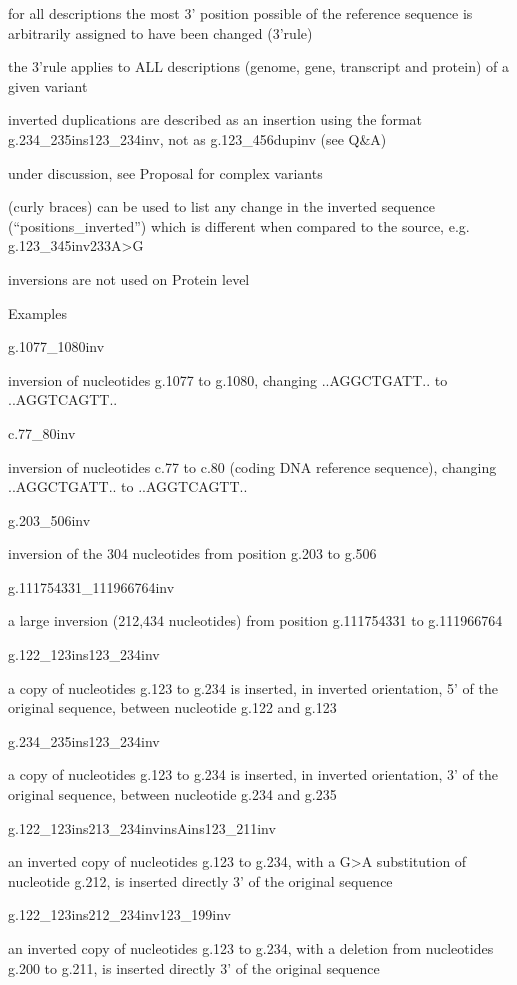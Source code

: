 \documentclass{book}
\begin{document}
	for all descriptions the most 3’ position possible of the reference sequence is arbitrarily assigned to have been changed (3’rule) 

	the 3’rule applies to ALL descriptions (genome, gene, transcript and protein) of a given variant

	inverted duplications are described as an insertion using the format g.234\_235ins123\_234inv, not as g.123\_456dupinv (see Q\&A)

	under discussion, see Proposal for complex variants

	{ } (curly braces) can be used to list any change in the inverted sequence (“positions\_inverted”) which is different when compared to the source, e.g. g.123\_345inv{233A>G}

	inversions are not used on Protein level

	

	

	Examples

	g.1077\_1080inv

	inversion of nucleotides g.1077 to g.1080, changing ..AGGCTGATT.. to ..AGGTCAGTT..

	c.77\_80inv

	inversion of nucleotides c.77 to c.80 (coding DNA reference sequence), changing ..AGGCTGATT.. to ..AGGTCAGTT..

	g.203\_506inv

	inversion of the 304 nucleotides from position g.203 to g.506

	g.111754331\_111966764inv

	a large inversion (212,434 nucleotides) from position g.111754331 to g.111966764

	g.122\_123ins123\_234inv

	a copy of nucleotides g.123 to g.234 is inserted, in inverted orientation, 5’ of the original sequence, between nucleotide g.122 and g.123

	g.234\_235ins123\_234inv

	a copy of nucleotides g.123 to g.234 is inserted, in inverted orientation, 3’ of the original sequence, between nucleotide g.234 and g.235

	g.122\_123ins213\_234invinsAins123\_211inv

	an inverted copy of nucleotides g.123 to g.234, with a G>A substitution of nucleotide g.212, is inserted directly 3’ of the original sequence

	g.122\_123ins212\_234inv123\_199inv

	an inverted copy of nucleotides g.123 to g.234, with a deletion from nucleotides g.200 to g.211, is inserted directly 3’ of the original sequence
\end{document}
